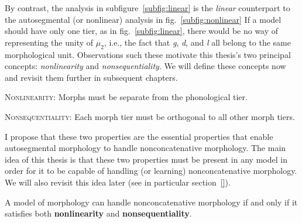 By contrast, the analysis in subfigure~\ref{subfig:linear} is the \emph{linear} counterpart to the autosegmental  (or nonlinear) analysis in fig.~\ref{subfig:nonlinear}
If a model should have only one tier, as in 
fig.~\ref{subfig:linear}, there would be no way of representing the
unity of $\mu_2$, i.e., the fact that \textit{g}, \textit{d}, and \textit{l}
all belong to the same morphological unit. Observations such these motivate this thesis's two principal concepts: \emph{nonlinearity} and \emph{nonsequentiality}. We will define these concepts now and revisit them further in subsequent chapters. 

	\begin{definition}\label{def:nl}{\textsc{Nonlinearity}}: %
	Morphs must be separate from the phonological tier. \end{definition}
	\begin{definition}\label{def:ns}{\textsc{Nonsequentiality}}: %
	Each morph tier must be orthogonal to all other morph tiers.
	\end{definition}
I propose that these two properties are the essential properties that enable autosegmental morphology to handle nonconcatenative morphology. The main idea of this thesis is that these two properties must be present in any model in order for it to be capable of handling (or learning) nonconcatenative morphology.  We will also revisit this idea later (see in particular section~\ref{}).
\begin{proposition}\label{prop:nlns}
A model of morphology can handle nonconcatenative morphology if and only if it satisfies both \textbf{nonlinearity} and \textbf{nonsequentiality}. %
\end{proposition}
